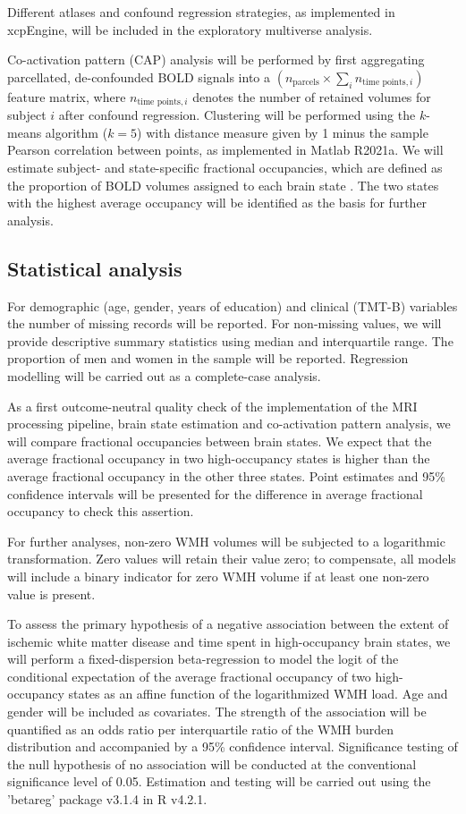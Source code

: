 Different atlases and confound regression strategies, as implemented in xcpEngine, will be included in the exploratory multiverse analysis.

Co-activation pattern (CAP) analysis will be performed by first aggregating parcellated, de-confounded BOLD signals into a $\left(n_{\text{parcels}}\times \sum_i{n_{\text{time points}, i}}\right)$ feature matrix, where $n_{\text{time points}, i}$ denotes the number of retained volumes for subject $i$ after confound regression.
Clustering will be performed using the $k$-means algorithm ($k=5$) with distance measure given by 1 minus the sample Pearson correlation between points, as implemented in Matlab R2021a.
We will estimate subject- and state-specific fractional occupancies, which are defined as the proportion of BOLD volumes assigned to each brain state \citep{Vidaurre2018-pb}. 
The two states with the highest average occupancy will be identified as the basis for further analysis.


\subsection{Statistical analysis}
For demographic (age, gender, years of education) and clinical (TMT-B) variables the number of missing records will be reported.
For non-missing values, we will provide descriptive summary statistics using median and interquartile range.
The proportion of men and women in the sample will be reported. Regression modelling will be carried out as a complete-case analysis.

As a first outcome-neutral quality check of the implementation of the MRI processing pipeline, brain state estimation and co-activation pattern analysis, we will compare fractional occupancies between brain states.
We expect that the average fractional occupancy in two high-occupancy states is higher than the average fractional occupancy in the other three states.
Point estimates and 95\% confidence intervals will be presented for the difference in average fractional occupancy to check this assertion.

For further analyses, non-zero WMH volumes will be subjected to a logarithmic transformation.
Zero values will retain their value zero; to compensate, all models will include a binary indicator for zero WMH volume if at least one non-zero value is present.

To assess the primary hypothesis of a negative association between the extent of ischemic white matter disease and time spent in high-occupancy brain states, we will perform a fixed-dispersion beta-regression to model the logit of the conditional expectation of the average fractional occupancy of two high-occupancy states as an affine function of the logarithmized WMH load.
Age and gender will be included as covariates.
The strength of the association will be quantified as an odds ratio per interquartile ratio of the WMH burden distribution and accompanied by a 95\% confidence interval.
Significance testing of the null hypothesis of no association will be conducted at the conventional significance level of 0.05.
Estimation and testing will be carried out using the 'betareg' package v3.1.4 in R v4.2.1.

